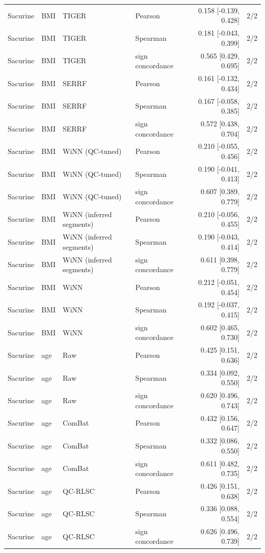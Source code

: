 \begin{landscape}
\begin{longtable}{llllrr}
Sacurine & BMI & TIGER & Pearson & 0.158 [-0.139, 0.428] & 2/2 \\
Sacurine & BMI & TIGER & Spearman & 0.181 [-0.043, 0.399] & 2/2 \\
Sacurine & BMI & TIGER & sign concordance & 0.565 [0.429, 0.695] & 2/2 \\
Sacurine & BMI & SERRF & Pearson & 0.161 [-0.132, 0.434] & 2/2 \\
Sacurine & BMI & SERRF & Spearman & 0.167 [-0.058, 0.385] & 2/2 \\
Sacurine & BMI & SERRF & sign concordance & 0.572 [0.438, 0.704] & 2/2 \\
Sacurine & BMI & WiNN (QC-tuned) & Pearson & 0.210 [-0.055, 0.456] & 2/2 \\
Sacurine & BMI & WiNN (QC-tuned) & Spearman & 0.190 [-0.041, 0.413] & 2/2 \\
Sacurine & BMI & WiNN (QC-tuned) & sign concordance & 0.607 [0.389, 0.779] & 2/2 \\
Sacurine & BMI & WiNN (inferred segments) & Pearson & 0.210 [-0.056, 0.455] & 2/2 \\
Sacurine & BMI & WiNN (inferred segments) & Spearman & 0.190 [-0.043, 0.414] & 2/2 \\
Sacurine & BMI & WiNN (inferred segments) & sign concordance & 0.611 [0.398, 0.779] & 2/2 \\
Sacurine & BMI & WiNN & Pearson & 0.212 [-0.051, 0.454] & 2/2 \\
Sacurine & BMI & WiNN & Spearman & 0.192 [-0.037, 0.415] & 2/2 \\
Sacurine & BMI & WiNN & sign concordance & 0.602 [0.465, 0.730] & 2/2 \\
Sacurine & age & Raw & Pearson & 0.425 [0.151, 0.636] & 2/2 \\
Sacurine & age & Raw & Spearman & 0.334 [0.092, 0.550] & 2/2 \\
Sacurine & age & Raw & sign concordance & 0.620 [0.496, 0.743] & 2/2 \\
Sacurine & age & ComBat & Pearson & 0.432 [0.156, 0.647] & 2/2 \\
Sacurine & age & ComBat & Spearman & 0.332 [0.086, 0.550] & 2/2 \\
Sacurine & age & ComBat & sign concordance & 0.611 [0.482, 0.735] & 2/2 \\
Sacurine & age & QC-RLSC & Pearson & 0.426 [0.151, 0.638] & 2/2 \\
Sacurine & age & QC-RLSC & Spearman & 0.336 [0.088, 0.554] & 2/2 \\
Sacurine & age & QC-RLSC & sign concordance & 0.626 [0.496, 0.739] & 2/2 \\

\end{longtable}
\end{landscape}
